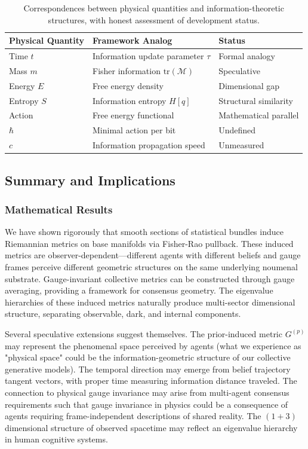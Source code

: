 \documentclass[11pt]{article}
\begin{document}
\begin{table}[h]
\centering
\begin{tabular}{|l|l|l|}
\hline
\textbf{Physical Quantity} & \textbf{Framework Analog} & \textbf{Status} \\
\hline
Time $t$ & Information update parameter $\tau$ & Formal analogy \\
Mass $m$ & Fisher information $\mathrm{tr}(\mathcal{M})$ & Speculative \\
Energy $E$ & Free energy density & Dimensional gap \\
Entropy $S$ & Information entropy $H[q]$ & Structural similarity \\
Action & Free energy functional & Mathematical parallel \\
$\hbar$ & Minimal action per bit & Undefined \\
$c$ & Information propagation speed & Unmeasured \\
\hline
\end{tabular}
\caption{Correspondences between physical quantities and information-theoretic structures, with honest assessment of development status.}
\label{tab:physical_correspondences}
\end{table}



\subsection{Summary and Implications}

\subsubsection{Mathematical Results}

We have shown rigorously that smooth sections of statistical bundles induce Riemannian metrics on base manifolds via Fisher-Rao pullback. These induced metrics are observer-dependent---different agents with different beliefs and gauge frames perceive different geometric structures on the same underlying noumenal substrate. Gauge-invariant collective metrics can be constructed through gauge averaging, providing a framework for consensus geometry. The eigenvalue hierarchies of these induced metrics naturally produce multi-sector dimensional structure, separating observable, dark, and internal components.

Several speculative extensions suggest themselves. The prior-induced metric $G^{(p)}$ may represent the phenomenal space perceived by agents (what we experience as "physical space" could be the information-geometric structure of our collective generative models). The temporal direction may emerge from belief trajectory tangent vectors, with proper time measuring information distance traveled. The connection to physical gauge invariance may arise from multi-agent consensus requirements such that gauge invariance in physics could be a consequence of agents requiring frame-independent descriptions of shared reality. The $(1+3)$ dimensional structure of observed spacetime may reflect an eigenvalue hierarchy in human cognitive systems.
\end{document}

